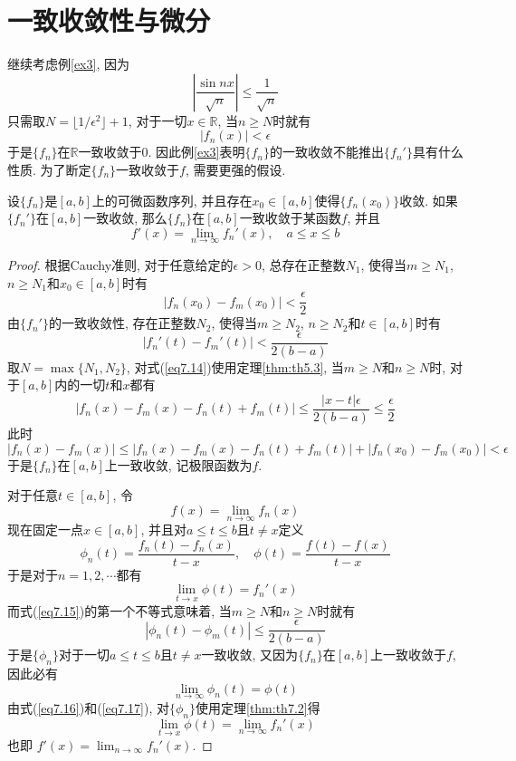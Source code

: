 \documentclass[cn,12pt,math=mtpro2,citestyle=gb7714-2015,bibstyle=gb7714-2015,twocol]{elegantbook}
\newcommand{\R}{\mathbb{R}}
\newcommand{\limn }{\lim_{n\to\infty}}
\begin{document}
\section{一致收敛性与微分}
继续考虑例\ref{ex3}, 因为
$$\left|\frac{\sin nx}{\sqrt{n}}\right|\leq \frac{1}{\sqrt{n}}$$
只需取$N=\lfloor 1/\epsilon^2 \rfloor+1$, 对于一切$x\in \R$, 当$n\geq N$时就有
$$|f_n(x)|<\epsilon$$
于是$\{f_n\}$在$\R$一致收敛于$0$. 因此例\ref{ex3}表明$\{f_n\}$的一致收敛不能推出$\{f_n'\}$具有什么性质. 为了断定$\{f_n\}$一致收敛于$f$, 需要更强的假设.
\begin{theorem}\label{thm:th7.9}
  设$\{f_n\}$是$[a,b]$上的可微函数序列, 并且存在$x_0\in[a,b]$使得$\{f_n(x_0)\}$收敛. 如果$\{f_n'\}$在$[a,b]$一致收敛, 那么$\{f_n\}$在$[a,b]$一致收敛于某函数$f$, 并且
  $$f'(x)=\limn f_n'(x),\quad a\leq x\leq b$$
\end{theorem}
\begin{proof}
  根据Cauchy准则, 对于任意给定的$\epsilon>0$, 总存在正整数$N_1$, 使得当$m\geq N_1$, $n\geq N_1$和$x_0\in[a,b]$时有
  \begin{equation}\label{eq7.13}
    |f_n(x_0)-f_m(x_0)|<\frac{\epsilon}{2}
  \end{equation}
  由$\{f_n'\}$的一致收敛性, 存在正整数$N_2$, 使得当$m\geq N_2$, $n\geq N_2$和$t\in[a,b]$时有
  \begin{equation}\label{eq7.14}
    |f_n'(t)-f_m'(t)|<\frac{\epsilon}{2(b-a)}
  \end{equation}
  取$N=\max\{N_1,N_2\}$, 对式(\ref{eq7.14})使用定理\ref{thm:th5.3}, 当$m\geq N$和$n\geq N$时, 对于$[a,b]$内的一切$t$和$x$都有
  \begin{equation}\label{eq7.15}
    |f_n(x)-f_m(x)-f_n(t)+f_m(t)|\leq\frac{|x-t|\epsilon}{2(b-a)}\leq\frac{\epsilon}{2}
  \end{equation}
  此时
  $$|f_n(x)-f_m(x)|\leq|f_n(x)-f_m(x)-f_n(t)+f_m(t)|+|f_n(x_0)-f_m(x_0)|<\epsilon$$
  于是$\{f_n\}$在$[a,b]$上一致收敛, 记极限函数为$f$.

  对于任意$t\in[a,b]$, 令
  $$f(x)=\limn f_n(x)$$
  现在固定一点$x\in[a,b]$, 并且对$a\leq t\leq b$且$t\neq x$定义
  $$\phi_n(t)=\frac{f_n(t)-f_n(x)}{t-x},\quad \phi(t)=\frac{f(t)-f(x)}{t-x}$$
  于是对于$n=1,2,\cdots$都有
  \begin{equation}\label{eq7.16}
    \lim_{t\to x}\phi(t)=f_n'(x)
  \end{equation}
  而式(\ref{eq7.15})的第一个不等式意味着, 当$m\geq N$和$n\geq N$时就有
  $$|\phi_n(t)-\phi_m(t)|\leq\frac{\epsilon}{2(b-a)}$$
  于是$\{\phi_n\}$对于一切$a\leq t\leq b$且$t\neq x$一致收敛, 又因为$\{f_n\}$在$[a,b]$上一致收敛于$f$, 因此必有
  \begin{equation}\label{eq7.17}
    \limn \phi_n(t)=\phi(t)
  \end{equation}
  由式(\ref{eq7.16})和(\ref{eq7.17}), 对$\{\phi_n\}$使用定理\ref{thm:th7.2}得
  $$\lim_{t\to x}\phi(t)=\limn f_n'(x)$$
  也即
  $f'(x)=\limn f_n'(x)$.

\end{proof}
\end{document}
